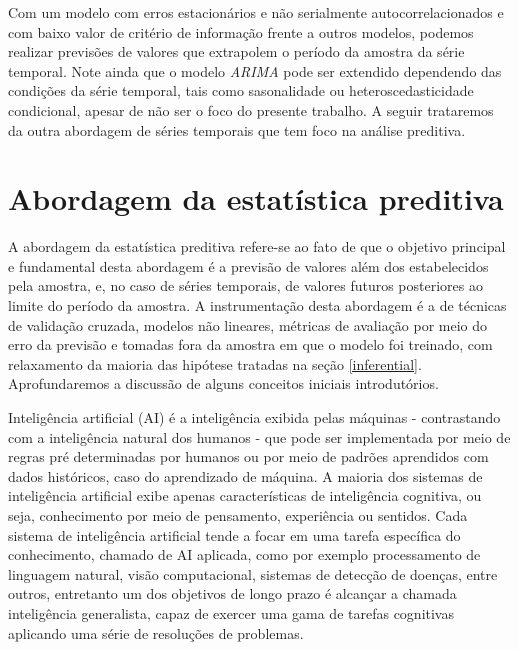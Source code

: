 \documentclass[twocolumn]{rbef}
\newcommand{\1}{\mathbbm{1}}
\begin{document}
Com um modelo com erros estacionários e não serialmente autocorrelacionados e com baixo valor de critério de informação frente a outros modelos, podemos realizar previsões \cite{Hamilton} de valores que extrapolem o período da amostra da série temporal. Note ainda que o modelo \textit{ARIMA} pode ser extendido dependendo das condições da série temporal, tais como sasonalidade ou heteroscedasticidade condicional\cite{Brockwell}, apesar de não ser o foco do presente trabalho. A seguir trataremos da outra abordagem de séries temporais que tem foco na análise preditiva.

\section{Abordagem da estatística preditiva} \label{predictive}

A abordagem da estatística preditiva refere-se ao fato de que o objetivo principal e fundamental desta abordagem é a previsão de valores além dos estabelecidos pela amostra, e, no caso de séries temporais, de valores futuros posteriores ao limite do período da amostra. A instrumentação desta abordagem é a de técnicas de validação cruzada, modelos não lineares, métricas de avaliação por meio do erro da previsão e tomadas fora da amostra em que o modelo foi treinado, com relaxamento da maioria das hipótese tratadas na seção \ref{inferential}. Aprofundaremos a discussão de alguns conceitos iniciais introdutórios.

Inteligência artificial (AI) é a inteligência exibida pelas máquinas - contrastando com a inteligência natural dos humanos - que pode ser implementada por meio de regras pré determinadas por humanos ou por meio de padrões aprendidos com dados históricos, caso do aprendizado de máquina\cite{Oliver}. A maioria dos sistemas de inteligência artificial exibe apenas características de inteligência cognitiva, ou seja, conhecimento por meio de pensamento, experiência ou sentidos. Cada sistema de inteligência artificial tende a focar em uma tarefa específica do conhecimento, chamado de AI aplicada, como por exemplo processamento de linguagem natural, visão computacional, sistemas de detecção de doenças, entre outros, entretanto um dos objetivos de longo prazo é alcançar a chamada inteligência generalista, capaz de exercer uma gama de tarefas cognitivas aplicando uma série de resoluções de problemas\cite{Laird}.
\end{document}
